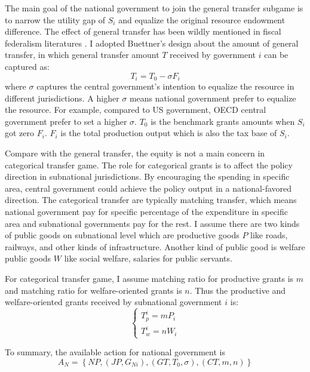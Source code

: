 \begin{itemize}
The main goal of the national government to join the general transfer subgame is to narrow the utility gap of $S_i$ and equalize the original resource endowment difference. The effect of general transfer has been wildly mentioned in fiscal federalism literatures \cite{buettner2006incentive,lv2018transfer}. I adopted Buettner's design about the amount of general transfer, in which general transfer amount $T$ received by government $i$ can be captured as:
$$T_i = T_0 - \sigma F_i $$ \label{generaltransfer}
where $\sigma$ captures the central government's intention to equalize the resource in different jurisdictions. A higher $\sigma$ means national government prefer to equalize the resource. For example, compared to US government, OECD central government prefer to set a higher $\sigma$. $T_0$ is the benchmark grants amounts when $S_i$ got zero $F_i$. $F_i$ is the total production output which is also the tax base of $S_i$.

Compare with the general transfer, the equity is not a main concern in categorical transfer game. The role for categorical grants is to affect the policy direction in subnational jurisdictions. By encouraging the spending in specific area, central government could achieve the policy output in a national-favored direction. The categorical transfer are typically matching transfer, which means national government pay for specific percentage of the expenditure in specific area and subnational governments pay for the rest. I assume there are two kinds of public goods on subnational level which are productive goods $P$ like roads, railways, and other kinds of infrastructure. Another kind of public good is welfare public goods $W$ like social welfare, salaries for public servants.

For categorical transfer game, I assume matching ratio for productive grants is $m$ and matching ratio for welfare-oriented grants is $n$. Thus the productive and welfare-oriented grants received by subnational government $i$ is:
$$
  \left\{\begin{array}{l}
    T_p^i=m P_i \\
    T_w^i=n W_i
  \end{array}\right.
$$
\label{mrmatrix}

To summary, the available action for national government is $$A_N=\left\{N P,\left(J P, G_{Ni}\right),\left(G T, T_0, \sigma\right),(C T, m,n)\right\} $$

\newpage



\end{itemize}
